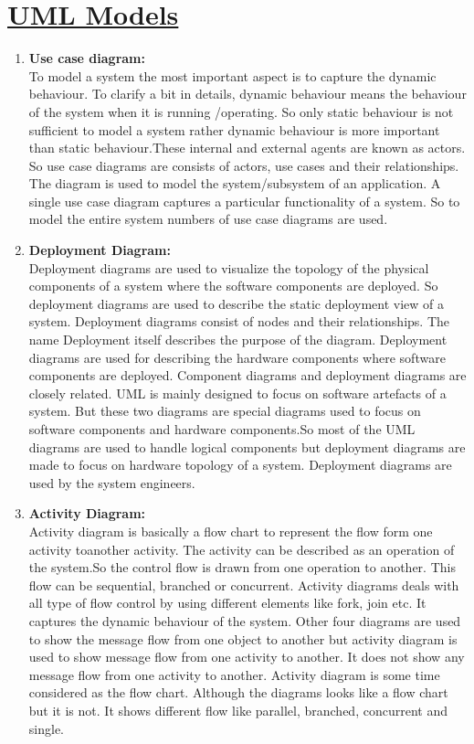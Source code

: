 \documentclass[12pt]{extreport}
\begin{document}
\section*{\underline{UML Models}}
\begin{enumerate}
\item \textbf{Use case diagram:}\\
To model a system the most important aspect is to capture the dynamic behaviour.
To clarify a bit in details, dynamic behaviour means the behaviour of the system when it is running /operating.
So only static behaviour is not sufficient to model a system rather dynamic
behaviour is more important than static behaviour.These internal and external agents are known as actors. So use case diagrams are consists of actors, use cases and their relationships. The diagram is used to model the system/subsystem of an application. A single use case diagram captures a particular functionality of a system.
So to model the entire system numbers of use case diagrams are used.
\item \textbf{Deployment Diagram:}\\
Deployment diagrams are used to visualize the topology of the physical
components of a system where the software components are deployed.
So deployment diagrams are used to describe the static deployment view of a system. Deployment diagrams consist of nodes and their relationships.
The name Deployment itself describes the purpose of the diagram. Deployment diagrams are used for describing the hardware components where software components are deployed. Component diagrams and deployment diagrams are closely related.
UML is mainly designed to focus on software artefacts of a system. But these two diagrams are special diagrams used to focus on software components and hardware components.So most of the UML diagrams are used to handle logical components but
deployment diagrams are made to focus on hardware topology of a system.
Deployment diagrams are used by the system engineers.
\item \textbf{Activity Diagram:}\\
Activity diagram is basically a flow chart to represent the flow form one activity toanother activity. The activity can be described as an operation of the system.So the control flow is drawn from one operation to another. This flow can be sequential, branched or concurrent. Activity diagrams deals with all type of flow control by using different elements like fork, join etc.
It captures the dynamic behaviour of the system. Other four diagrams are used to show the message flow from one object to another but activity diagram is used to show message flow from one activity to another.
It does not show any message flow from one activity to another. Activity diagram is some time considered as the flow chart. Although the diagrams looks like a flow chart but it is not. It shows different flow like parallel, branched, concurrent and single.


\end{enumerate}
\end{document}
